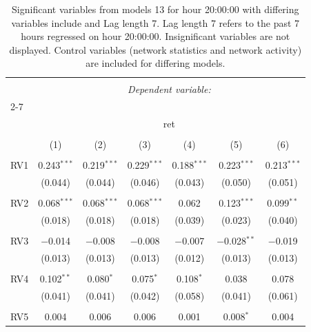 
\begin{table}[!htbp] \centering 
  \caption{Significant variables from models 13 for hour 20:00:00 with differing variables include 
                               and Lag length 7. Lag length 7 refers to the past 7 hours regressed on hour 20:00:00. 
                               Insignificant variables are not displayed. 
                               Control variables (network statistics and network activity) are 
                               included for differing models.} 
  \label{RVmodels1_t_hourlagged7} 
\scriptsize 
\begin{tabular}{@{\extracolsep{5pt}}lcccccc} 
\\[-1.8ex]\hline 
\hline \\[-1.8ex] 
 & \multicolumn{6}{c}{\textit{Dependent variable:}} \\ 
\cline{2-7} 
\\[-1.8ex] & \multicolumn{6}{c}{ret} \\ 
\\[-1.8ex] & (1) & (2) & (3) & (4) & (5) & (6)\\ 
\hline \\[-1.8ex] 
 RV1 & 0.243$^{***}$ & 0.219$^{***}$ & 0.229$^{***}$ & 0.188$^{***}$ & 0.223$^{***}$ & 0.213$^{***}$ \\ 
  & (0.044) & (0.044) & (0.046) & (0.043) & (0.050) & (0.051) \\ 
  & & & & & & \\ 
 RV2 & 0.068$^{***}$ & 0.068$^{***}$ & 0.068$^{***}$ & 0.062 & 0.123$^{***}$ & 0.099$^{**}$ \\ 
  & (0.018) & (0.018) & (0.018) & (0.039) & (0.023) & (0.040) \\ 
  & & & & & & \\ 
 RV3 & $-$0.014 & $-$0.008 & $-$0.008 & $-$0.007 & $-$0.028$^{**}$ & $-$0.019 \\ 
  & (0.013) & (0.013) & (0.013) & (0.012) & (0.013) & (0.013) \\ 
  & & & & & & \\ 
 RV4 & 0.102$^{**}$ & 0.080$^{*}$ & 0.075$^{*}$ & 0.108$^{*}$ & 0.038 & 0.078 \\ 
  & (0.041) & (0.041) & (0.042) & (0.058) & (0.041) & (0.061) \\ 
  & & & & & & \\ 
 RV5 & 0.004 & 0.006 & 0.006 & 0.001 & 0.008$^{*}$ & 0.004 \\ 

\end{tabular}
\end{table}
